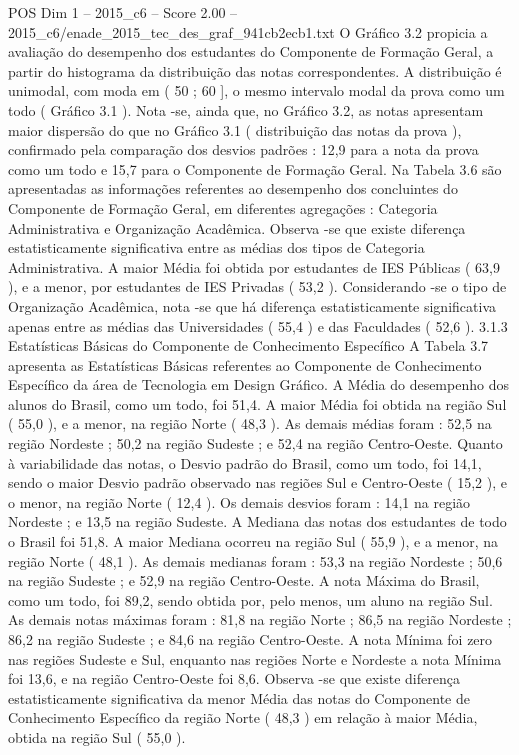 \begin{textsample}{POS Dim 1 – 2015\_c6 – Score 2.00 – 2015\_c6/enade\_2015\_tec\_des\_graf\_941cb2ecb1.txt}
O Gráfico 3.2 propicia a avaliação do desempenho dos estudantes do Componente de Formação Geral, a partir do histograma da distribuição das notas correspondentes.
A distribuição é unimodal, com moda em ( 50 ; 60 ], o mesmo intervalo modal da prova como um todo ( Gráfico 3.1 ).
Nota -se, ainda que, no Gráfico 3.2, as notas apresentam maior dispersão do que no Gráfico 3.1 ( distribuição das notas da prova ), confirmado pela comparação dos desvios padrões : 12,9 para a nota da prova como um todo e 15,7 para o Componente de Formação Geral.
Na Tabela 3.6 são apresentadas as informações referentes ao desempenho dos concluintes do Componente de Formação Geral, em diferentes agregações : Categoria Administrativa e Organização Acadêmica.
Observa -se que existe diferença estatisticamente significativa entre as médias dos tipos de Categoria Administrativa.
A maior Média foi obtida por estudantes de IES Públicas ( 63,9 ), e a menor, por estudantes de IES Privadas ( 53,2 ).
Considerando -se o tipo de Organização Acadêmica, nota -se que há diferença estatisticamente significativa apenas entre as médias das Universidades ( 55,4 ) e das Faculdades ( 52,6 ). 3.1.3 Estatísticas Básicas do Componente de Conhecimento Específico A Tabela 3.7 apresenta as Estatísticas Básicas referentes ao Componente de Conhecimento Específico da área de Tecnologia em Design Gráfico.
A Média do desempenho dos alunos do Brasil, como um todo, foi 51,4.
A maior Média foi obtida na região Sul ( 55,0 ), e a menor, na região Norte ( 48,3 ).
As demais médias foram : 52,5 na região Nordeste ; 50,2 na região Sudeste ; e 52,4 na região Centro-Oeste.
Quanto à variabilidade das notas, o Desvio padrão do Brasil, como um todo, foi 14,1, sendo o maior Desvio padrão observado nas regiões Sul e Centro-Oeste ( 15,2 ), e o menor, na região Norte ( 12,4 ).
Os demais desvios foram : 14,1 na região Nordeste ; e 13,5 na região Sudeste.
A Mediana das notas dos estudantes de todo o Brasil foi 51,8.
A maior Mediana ocorreu na região Sul ( 55,9 ), e a menor, na região Norte ( 48,1 ).
As demais medianas foram : 53,3 na região Nordeste ; 50,6 na região Sudeste ; e 52,9 na região Centro-Oeste.
A nota Máxima do Brasil, como um todo, foi 89,2, sendo obtida por, pelo menos, um aluno na região Sul.
As demais notas máximas foram : 81,8 na região Norte ; 86,5 na região Nordeste ; 86,2 na região Sudeste ; e 84,6 na região Centro-Oeste.
A nota Mínima foi zero nas regiões Sudeste e Sul, enquanto nas regiões Norte e Nordeste a nota Mínima foi 13,6, e na região Centro-Oeste foi 8,6.
Observa -se que existe diferença estatisticamente significativa da menor Média das notas do Componente de Conhecimento Específico da região Norte ( 48,3 ) em relação à maior Média, obtida na região Sul ( 55,0 ).

\end{textsample}
